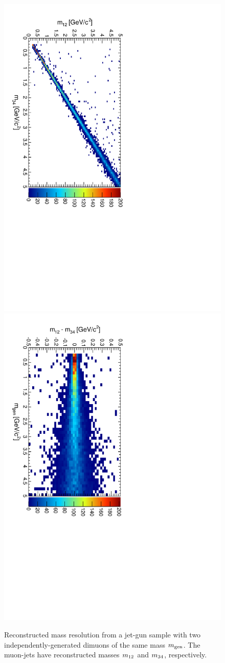 \documentclass[12pt]{article}
\newcommand{\s}[1]{{\mbox{\scriptsize #1}}}
\begin{document}
\begin{figure}
\includegraphics[height=0.5\linewidth, angle=90]{fig/acceptance3_plot/m12m34.pdf}
\includegraphics[height=0.5\linewidth, angle=90]{fig/acceptance3_plot/mdiff_vs_mass.pdf}

\caption{Reconstructed mass resolution from a jet-gun sample with two
  independently-generated dimuons of the same mass $m_\s{gen}$.  The
  muon-jets have reconstructed masses $m_\s{12}$ and $m_\s{34}$,
  respectively. \label{fig:pairpair_mass_constraint_signal}}
\end{figure}
\end{document}
